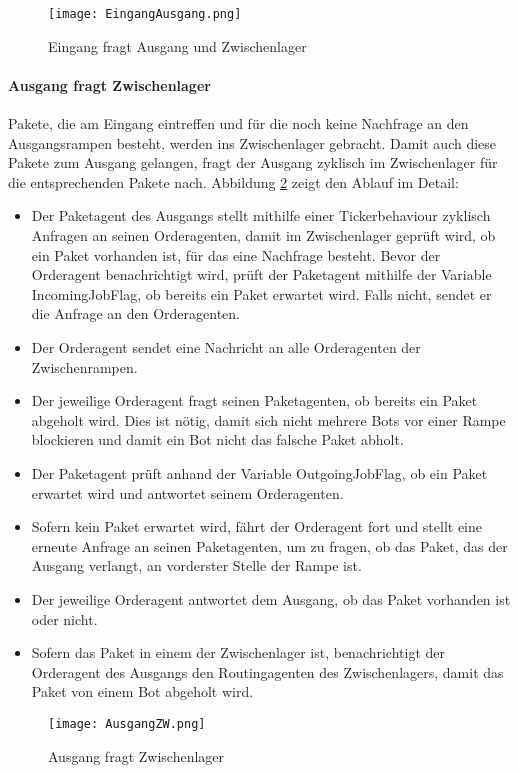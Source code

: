 \begin{figure}[h!]
	\centering
		\texttt{[image: EingangAusgang.png]}        
		\caption{Eingang fragt Ausgang und Zwischenlager}
	\label{Eingang fragt}
\end{figure}
\newpage
\paragraph{Ausgang fragt Zwischenlager}
Pakete, die am Eingang eintreffen und für die noch keine Nachfrage an den Ausgangsrampen besteht, werden ins Zwischenlager gebracht. Damit auch diese Pakete zum Ausgang gelangen, fragt der Ausgang zyklisch im Zwischenlager für die entsprechenden Pakete nach. Abbildung \ref{Ausgang fragt} zeigt den Ablauf im Detail:
\begin{itemize}
\item Der Paketagent des Ausgangs stellt mithilfe einer Tickerbehaviour zyklisch Anfragen an seinen Orderagenten, damit im Zwischenlager geprüft wird, ob ein Paket vorhanden ist, für das eine Nachfrage besteht. Bevor der Orderagent benachrichtigt wird, prüft der Paketagent mithilfe der Variable IncomingJobFlag, ob bereits ein Paket erwartet wird. Falls nicht, sendet er die Anfrage an den Orderagenten.  
\item Der Orderagent sendet eine Nachricht an alle Orderagenten der Zwischenrampen.
\item Der jeweilige Orderagent fragt seinen Paketagenten, ob bereits ein Paket abgeholt wird. Dies ist nötig, damit sich nicht mehrere Bots vor einer Rampe blockieren und damit ein Bot nicht das falsche Paket abholt.
\item Der Paketagent prüft anhand der Variable OutgoingJobFlag, ob ein Paket erwartet wird und antwortet seinem Orderagenten.
\item Sofern kein Paket erwartet wird, fährt der Orderagent fort und stellt eine erneute Anfrage an seinen Paketagenten, um zu fragen, ob das Paket, das der Ausgang verlangt, an vorderster Stelle der Rampe ist.
\item Der jeweilige Orderagent antwortet dem Ausgang, ob das Paket vorhanden ist oder nicht.
\item Sofern das Paket in einem der Zwischenlager ist, benachrichtigt der Orderagent des Ausgangs den Routingagenten des Zwischenlagers, damit das Paket von einem Bot abgeholt wird. 
\end{itemize} 
\begin{figure}[h!]
	\centering
		\texttt{[image: AusgangZW.png]}        
		\caption{Ausgang fragt Zwischenlager}
	\label{Ausgang fragt}
\end{figure}
\newpage
